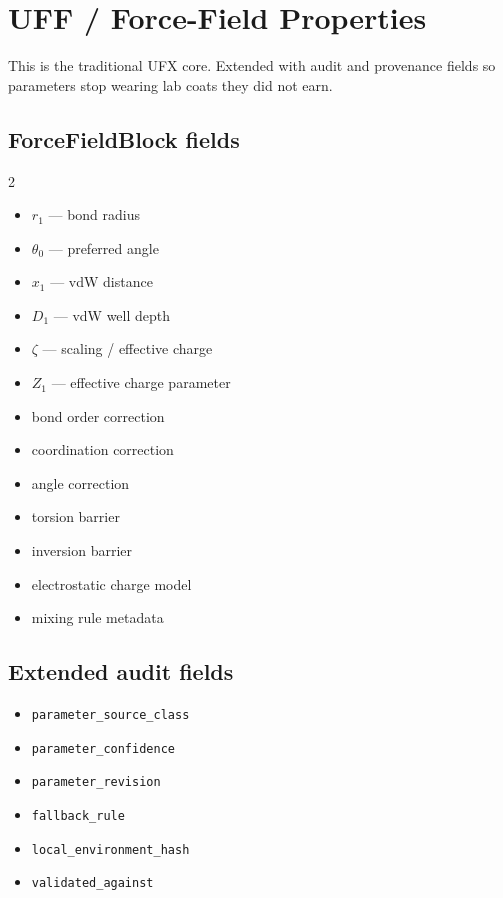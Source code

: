 \documentclass[11pt, a4paper]{article}
\begin{document}
\section{UFF / Force-Field Properties}

This is the traditional UFX core. Extended with audit and provenance fields so parameters stop wearing lab coats they did not earn.

\subsection{ForceFieldBlock fields}

\begin{multicols}{2}
\begin{itemize}[itemsep=1pt, leftmargin=*]
  \item $r_1$ --- bond radius
  \item $\theta_0$ --- preferred angle
  \item $x_1$ --- vdW distance
  \item $D_1$ --- vdW well depth
  \item $\zeta$ --- scaling / effective charge
  \item $Z_1$ --- effective charge parameter
  \item bond order correction
  \item coordination correction
  \item angle correction
  \item torsion barrier
  \item inversion barrier
  \item electrostatic charge model
  \item mixing rule metadata
\end{itemize}
\end{multicols}

\subsection{Extended audit fields}

\begin{itemize}[itemsep=1pt, leftmargin=*]
  \item \texttt{parameter\_source\_class}
  \item \texttt{parameter\_confidence}
  \item \texttt{parameter\_revision}
  \item \texttt{fallback\_rule}
  \item \texttt{local\_environment\_hash}
  \item \texttt{validated\_against}
\end{itemize}
\end{document}
